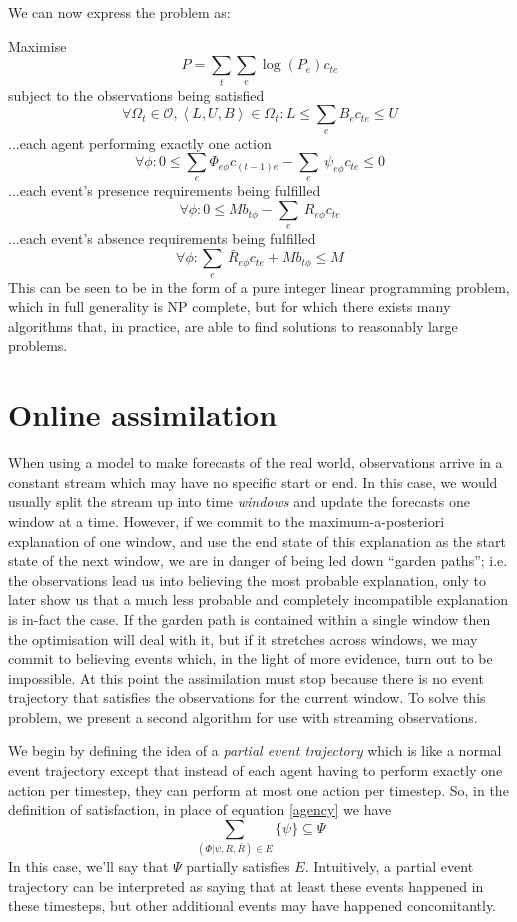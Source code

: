 \documentclass{article}
\begin{document}
We can now express the problem as:

Maximise
\[
P = \sum_t\sum_e \log(P_e)c_{te}
\]
subject to the observations being satisfied
\[
\forall \Omega_t \in \mathcal{O}, \left<L,U,B\right> \in \Omega_t: L \le \sum_e B_e c_{te} \le U
\]
...each agent performing exactly one action
\begin{equation}
\forall\phi: 0 \le \sum_e  \Phi_{e\phi}c_{(t-1)e} -  \sum_e\ \psi_{e\phi} c_{te} \le 0
\label{IPagency}
\end{equation}
...each event's presence requirements being fulfilled
\[
\forall\phi: 0 \le Mb_{t\phi} - \sum_e\ R_{e\phi} c_{te} 
\]
...each event's absence requirements being fulfilled
\[
\forall\phi: \sum_e\ \bar{R}_{e\phi} c_{te} + Mb_{t\phi} \le M
\]
This can be seen to be in the form of a pure integer linear programming problem, which in full generality is NP complete, but for which there exists many algorithms that, in practice, are able to find solutions to reasonably large problems.


\section{Online assimilation}

When using a model to make forecasts of the real world, observations arrive in a constant stream which may have no specific start or end. In this case, we would usually split the stream up into time \textit{windows} and update the forecasts one window at a time. However, if we commit to the maximum-a-posteriori explanation of one window, and use the end state of this explanation as the start state of the next window, we are in danger of being led down ``garden paths''; i.e. the observations lead us into believing the most probable explanation, only to later show us that a much less probable and completely incompatible explanation is in-fact the case. If the garden path is contained within a single window then the optimisation will deal with it, but if it stretches across windows, we may commit to believing events which, in the light of more evidence, turn out to be impossible. At this point the assimilation must stop because there is no event trajectory that satisfies the observations for the current window. To solve this problem, we present a second algorithm for use with streaming observations.

We begin by defining the idea of a \textit{partial event trajectory} which is like a normal event trajectory except that instead of each agent having to perform exactly one action per timestep, they can perform at most one action per timestep. So, in the definition of satisfaction, in place of equation \ref{agency} we have
\begin{equation}
\sum_{(\Phi|\psi,R,\bar{R})\in E}\{\psi\} \subseteq \Psi
\end{equation}
In this case, we'll say that $\Psi$ partially satisfies $E$. Intuitively, a partial event trajectory can be interpreted as saying that at least these events happened in these timesteps, but other additional events may have happened concomitantly.
\end{document}
